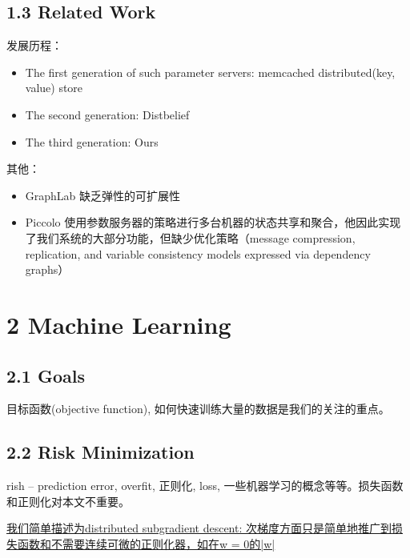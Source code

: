 \documentclass[11pt]{article}
\begin{document}
\subsection{1.3 Related Work}
\label{sec:org9a0ee71}
发展历程：
\begin{itemize}
\item The first generation of such parameter servers: memcached distributed(key, value) store
\item The second generation: Distbelief
\item The third generation: Ours
\end{itemize}

其他：
\begin{itemize}
\item GraphLab 缺乏弹性的可扩展性
\item Piccolo 使用参数服务器的策略进行多台机器的状态共享和聚合，他因此实现了我们系统的大部分功能，但缺少优化策略（message compression, replication, and variable consistency models expressed via dependency graphs）
\end{itemize}
\section{2 Machine Learning}
\label{sec:org527e603}
\subsection{2.1 Goals}
\label{sec:org8980a79}
目标函数(objective function), 如何快速训练大量的数据是我们的关注的重点。
\subsection{2.2 Risk Minimization}
\label{sec:org456bd8d}
rish -- prediction error, overfit, 正则化, loss, 一些机器学习的概念等等。损失函数和正则化对本文不重要。

\uline{我们简单描述为distributed subgradient descent: 次梯度方面只是简单地推广到损失函数和不需要连续可微的正则化器，如在w = 0的|w|}
\end{document}
